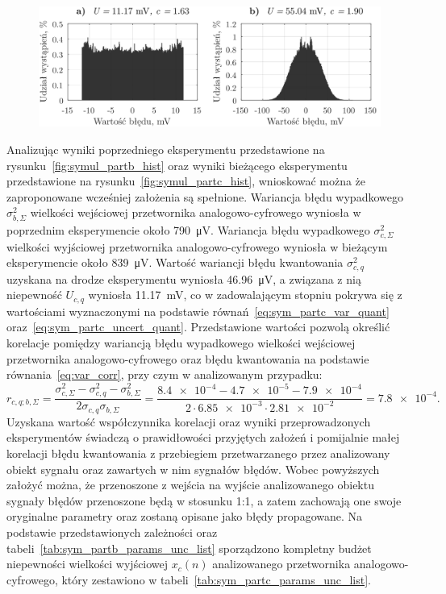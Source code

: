 \begin{figure}[htb!]
\begin{center}
\includegraphics{obrazki/hist_part_c}
\end{center}
\end{figure}

Analizując wyniki poprzedniego eksperymentu przedstawione na rysunku~\ref{fig:symul_partb_hist} oraz wyniki bieżącego eksperymentu przedstawione na rysunku~\ref{fig:symul_partc_hist}, wnioskować można że zaproponowane wcześniej założenia są spełnione. Wariancja błędu wypadkowego $\sigma_{b,\Sigma}^{2}$ wielkości wejściowej przetwornika analogowo-cyfrowego wyniosła w poprzednim eksperymencie około \qty{790}{\micro V}. Wariancja błędu wypadkowego $\sigma_{c,\Sigma}^{2}$ wielkości wyjściowej przetwornika analogowo-cyfrowego wyniosła w bieżącym eksperymencie około \qty{839}{\micro V}. Wartość wariancji błędu kwantowania $\sigma_{c,q}^{2}$ uzyskana na drodze eksperymentu wyniosła \qty{46.96}{\micro V}, a związana z nią niepewność $U_{c,q}$ wyniosła \qty{11.17}{mV}, co w zadowalającym stopniu pokrywa się z wartościami wyznaczonymi na podstawie równań~\eqref{eq:sym_partc_var_quant} oraz~\eqref{eq:sym_partc_uncert_quant}. Przedstawione wartości pozwolą określić korelacje pomiędzy wariancją błędu wypadkowego wielkości wejściowej przetwornika analogowo-cyfrowego oraz błędu kwantowania na podstawie równania~\eqref{eq:var_corr}, przy czym w analizowanym przypadku:
\begin{equation}
r_{c,q;b,\Sigma} = \frac{\sigma_{c,\Sigma}^{2} - \sigma_{c,q}^{2} - \sigma_{b,\Sigma}^{2}}{2 \sigma_{c,q} \sigma_{b,\Sigma}} = \frac{\num{8.4e-4} - \num{4.7e-5} - \num{7.9e-4}}{2 \cdot \num{6.85e-3} \cdot \num{2.81e-2}} = \num{7.8e-4} \label{eq:sym_partc_corr}.
\end{equation}
Uzyskana wartość współczynnika korelacji oraz wyniki przeprowadzonych eksperymentów świadczą o prawidłowości przyjętych założeń i pomijalnie małej korelacji błędu kwantowania z przebiegiem przetwarzanego przez analizowany obiekt sygnału oraz zawartych w nim sygnałów błędów. Wobec powyższych założyć można, że przenoszone z wejścia na wyjście analizowanego obiektu sygnały błędów przenoszone będą w stosunku 1:1, a zatem zachowają one swoje oryginalne parametry oraz zostaną opisane jako błędy propagowane. Na podstawie przedstawionych zależności oraz tabeli~\ref{tab:sym_partb_params_unc_list} sporządzono kompletny budżet niepewności wielkości wyjściowej $x_{c}(n)$ analizowanego przetwornika analogowo-cyfrowego, który zestawiono w tabeli~\ref{tab:sym_partc_params_unc_list}.

